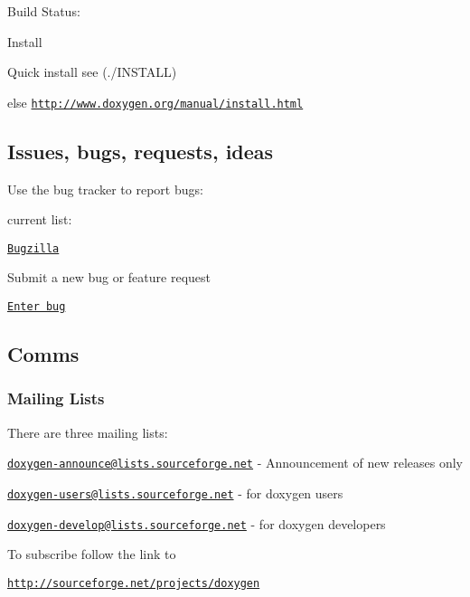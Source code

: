 \begin{DoxyItemize}
\item Build Status\-: \href{https://travis-ci.org/doxygen/doxygen}{\tt }
\item Install
\begin{DoxyItemize}
\item Quick install see (./\-I\-N\-S\-T\-A\-L\-L)
\item else \href{http://www.doxygen.org/manual/install.html}{\tt http\-://www.\-doxygen.\-org/manual/install.\-html}
\end{DoxyItemize}
\end{DoxyItemize}

\subsection*{Issues, bugs, requests, ideas }

Use the bug tracker to report bugs\-:
\begin{DoxyItemize}
\item current list\-:
\begin{DoxyItemize}
\item \href{https://bugzilla.gnome.org/buglist.cgi?product=doxygen&bug_status=UNCONFIRMED&bug_status=NEW&bug_status=ASSIGNED&bug_status=REOPENED}{\tt Bugzilla}
\end{DoxyItemize}
\item Submit a new bug or feature request
\begin{DoxyItemize}
\item \href{https://bugzilla.gnome.org/enter_bug.cgi?product=doxygen}{\tt Enter bug}
\end{DoxyItemize}
\end{DoxyItemize}

\subsection*{Comms }

\subsubsection*{Mailing Lists}

There are three mailing lists\-:


\begin{DoxyItemize}
\item \href{mailto:doxygen-announce@lists.sourceforge.net}{\tt doxygen-\/announce@lists.\-sourceforge.\-net} -\/ Announcement of new releases only
\item \href{mailto:doxygen-users@lists.sourceforge.net}{\tt doxygen-\/users@lists.\-sourceforge.\-net} -\/ for doxygen users
\item \href{mailto:doxygen-develop@lists.sourceforge.net}{\tt doxygen-\/develop@lists.\-sourceforge.\-net} -\/ for doxygen developers
\item To subscribe follow the link to
\begin{DoxyItemize}
\item \href{http://sourceforge.net/projects/doxygen}{\tt http\-://sourceforge.\-net/projects/doxygen}
\end{DoxyItemize}
\end{DoxyItemize}

